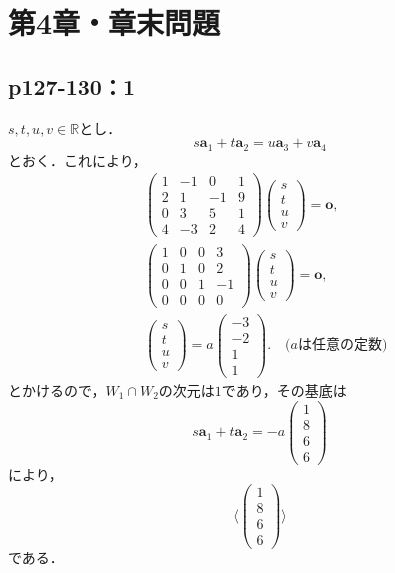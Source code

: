 \documentclass[uplatex,dvipdfmx,a4paper,10pt,fleqn]{jsarticle}
\begin{document}
\section*{第4章・章末問題}


\subsection*{p127-130：1}

\begin{tleftbar}
$s,t,u,v \in \mathbb{R}$とし．
\[
s\bm{a}_1+t\bm{a}_2=u\bm{a}_3+v\bm{a}_4
\]
とおく．これにより，
\begin{align*}
    &
\begin{pmatrix}
1 & -1 & 0 & 1 \\
2 & 1 & -1 & 9 \\
0 & 3 & 5 & 1 \\
4 & -3 & 2 & 4 
\end{pmatrix}
\begin{pmatrix}
s \\
t \\
u \\
v 
\end{pmatrix}
=\bm{o} ,\\
& 
\begin{pmatrix}
1 & 0 & 0 & 3 \\
0 & 1 & 0 & 2 \\
0 & 0 & 1 & -1 \\
0 & 0 & 0 & 0 
\end{pmatrix}
\begin{pmatrix}
s \\
t \\
u \\
v 
\end{pmatrix}
=\bm{o} ,\\
&
\begin{pmatrix}
s \\
t \\
u \\
v 
\end{pmatrix}
=a
\begin{pmatrix}
-3 \\
-2 \\
1 \\
1 
\end{pmatrix}
. \quad \text{($a$は任意の定数)}
\end{align*}
とかけるので，$W_1 \cap W_2$の次元は$1$であり，その基底は
\[
    s \bm{a}_1+ t \bm{a}_2 =-a \begin{pmatrix} 1 \\ 8 \\ 6 \\ 6 \end{pmatrix}
\]
により，
\[
    \langle 
        \begin{pmatrix}
        1 \\
        8 \\
        6 \\
        6
        \end{pmatrix}
    \rangle 
\]
である．
\end{tleftbar}
\end{document}
